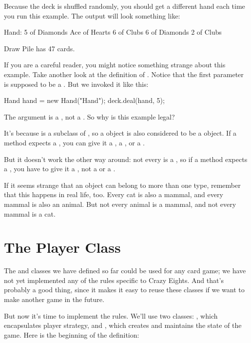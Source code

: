 Because the deck is shuffled randomly, you should get a different hand each time you run this example.
The output will look something like:

\begin{stdout}
Hand:
5 of Diamonds
Ace of Hearts
6 of Clubs
6 of Diamonds
2 of Clubs

Draw Pile has 47 cards.
\end{stdout}

If you are a careful reader, you might notice something strange about this example.
Take another look at the definition of .
Notice that the first parameter is supposed to be a .
But we invoked it like this:

\begin{code}
Hand hand = new Hand("Hand");
deck.deal(hand, 5);
\end{code}

The argument is a , not a .
So why is this example legal?

It's because  is a subclass of , so a  object is also considered to be a  object.
If a method expects a , you can give it a , a , or a .

But it doesn't work the other way around: not every  is a , so if a method expects a , you have to give it a , not a  or a .

If it seems strange that an object can belong to more than one type, remember that this happens in real life, too.
Every cat is also a mammal, and every mammal is also an animal.
But not every animal is a mammal, and not every mammal is a cat.



\section{The Player Class}

The  and  classes we have defined so far could be used for any card game; we have not yet implemented any of the rules specific to Crazy Eights.
And that's probably a good thing, since it makes it easy to reuse these classes if we want to make another game in the future.

But now it's time to implement the rules.
We'll use two classes: , which encapsulates player strategy, and , which creates and maintains the state of the game.
Here is the beginning of the  definition:

